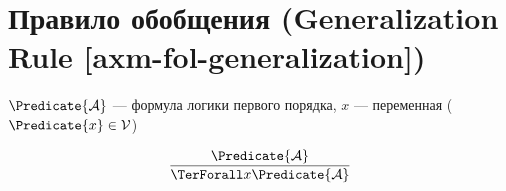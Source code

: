 
\section{Правило обобщения (Generalization Rule [axm-fol-generalization])}

\hypertarget{axm-fol-generalization}{}
\begin{axiom}
\label{entity:axm-fol-generalization}
$\Predicate{\mathcal{A}}$ --- формула логики первого порядка,
$x$ --- переменная ($\Predicate{x} \in \mathcal{V}$)

\[
\frac{\Predicate{\mathcal{A}}}{\TerForall x \Predicate{\mathcal{A}}}
\]
\end{axiom}